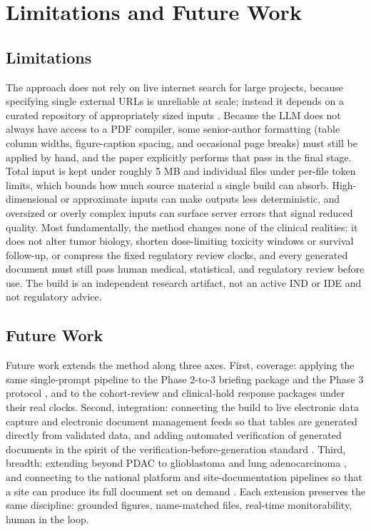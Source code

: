 \section{Limitations and Future Work}

\subsection{Limitations}

The approach does not rely
on live internet search for large projects, because specifying single external URLs
is unreliable at scale; instead it depends on a curated repository of appropriately
sized inputs \cite{adoptionguide}. Because the LLM does not always have access to a
PDF compiler, some senior-author formatting (table column widths, figure-caption
spacing, and occasional page breaks) must still be applied by hand, and the paper
explicitly performs that pass in the final stage. Total input is kept under roughly
5 MB and individual files under per-file token limits, which bounds how much source
material a single build can absorb. High-dimensional or approximate inputs can make
outputs less deterministic, and oversized or overly complex inputs can surface server
errors that signal reduced quality. Most fundamentally, the method changes none of
the clinical realities: it does not alter tumor biology, shorten dose-limiting
toxicity windows or survival follow-up, or compress the fixed regulatory review
clocks, and every generated document must still pass human medical, statistical, and
regulatory review before use. The build is an independent research artifact, not an
active IND or IDE and not regulatory advice.

\subsection{Future Work}

Future work extends the method along three axes. First, coverage: applying the same
single-prompt pipeline to the Phase 2-to-3 briefing package and the Phase 3 protocol
\cite{phase2protocol}, and to the cohort-review and clinical-hold response packages
under their real clocks. Second, integration: connecting the build to live electronic
data capture and electronic document management feeds so that tables are generated
directly from validated data, and adding automated verification of generated
documents in the spirit of the verification-before-generation standard
\cite{hr9510v5}. Third, breadth: extending beyond PDAC to glioblastoma and lung
adenocarcinoma \cite{gbmsynergy, lungadeno}, and connecting to the national platform
and site-documentation pipelines so that a site can produce its full document set on
demand \cite{natplatform}. Each extension preserves the same discipline: grounded
figures, name-matched files, real-time monitorability, human in the loop.
